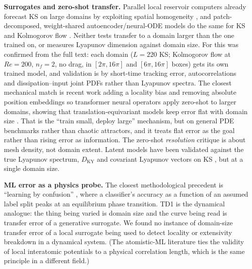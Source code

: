 \documentclass[11pt]{article}
\begin{document}
\textbf{Surrogates and zero-shot transfer.} Parallel local reservoir
computers already forecast KS on large domains by exploiting spatial
homogeneity \cite{pathak2018}, and patch-decomposed, weight-shared
autoencoder/neural-ODE models do the same for KS and Kolmogorov flow
\cite{constanteamores2024}. Neither tests transfer to a domain larger
than the one trained on, or measures Lyapunov dimension against domain
size. For \cite{constanteamores2024} this was confirmed from the full
text: each domain ($L{=}220$ KS; Kolmogorov flow at $Re{=}200$,
$n_f{=}2$, no drag, in $[2\pi,16\pi]$ and $[6\pi,16\pi]$ boxes) gets its
own trained model, and validation is by short-time tracking error,
autocorrelations and dissipation--input joint PDFs rather than Lyapunov
spectra. The closest mechanical match is recent
work adding a locality bias and removing absolute position embeddings
so transformer neural operators apply zero-shot to larger domains,
showing that translation-equivariant models keep error flat with domain
size \cite{zeroshotlargerdomains2026}. That is the ``train small, deploy
large'' mechanism, but on general PDE benchmarks rather than chaotic
attractors, and it treats flat error as the goal rather than rising
error as information. The zero-shot \emph{resolution} critique
\cite{falsepromisezeroshot2026} is about mesh density, not domain extent.
Latent models have been validated against the true Lyapunov spectrum,
$D_{\mathrm{KY}}$ and covariant Lyapunov vectors on KS
\cite{ozalpmagri2025}, but at a single domain size.

\textbf{ML error as a physics probe.} The closest methodological
precedent is ``learning by confusion'' \cite{vannieuwenburg2017}, where
a classifier's accuracy as a function of an assumed label split peaks at
an equilibrium phase transition. TD1 is the dynamical analogue: the
thing being varied is domain size and the curve being read is transfer
error of a generative surrogate. We found no instance of domain-size
transfer error of a local surrogate being used to detect locality or
extensivity breakdown in a dynamical system. (The atomistic-ML
literature ties the validity of local interatomic potentials to a
physical correlation length, which is the same principle in a different
field.)
\end{document}

